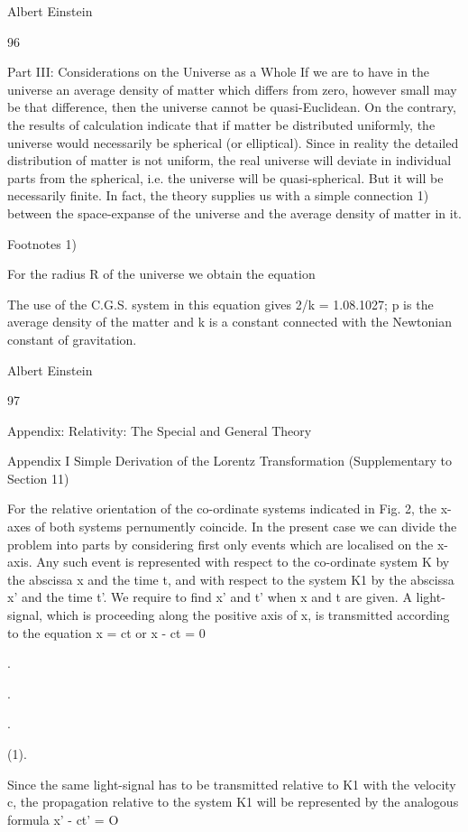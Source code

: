 \documentclass{article}
\begin{document}
Albert Einstein

96

Part III: Considerations on the Universe as a Whole
If we are to have in the universe an average density of matter which differs from zero,
however small may be that difference, then the universe cannot be quasi-Euclidean. On the
contrary, the results of calculation indicate that if matter be distributed uniformly, the
universe would necessarily be spherical (or elliptical). Since in reality the detailed
distribution of matter is not uniform, the real universe will deviate in individual parts from
the spherical, i.e. the universe will be quasi-spherical. But it will be necessarily finite. In
fact, the theory supplies us with a simple connection 1) between the space-expanse of the
universe and the average density of matter in it.

Footnotes
1)

For the radius R of the universe we obtain the equation

The use of the C.G.S. system in this equation gives 2/k = 1.08.1027; p is the average density
of the matter and k is a constant connected with the Newtonian constant of gravitation.

Albert Einstein

97

Appendix: Relativity: The Special and General Theory

Appendix I
Simple Derivation of the Lorentz Transformation
(Supplementary to Section 11)

For the relative orientation of the co-ordinate systems indicated in Fig. 2, the x-axes of
both systems pernumently coincide. In the present case we can divide the problem into parts
by considering first only events which are localised on the x-axis. Any such event is
represented with respect to the co-ordinate system K by the abscissa x and the time t, and
with respect to the system K1 by the abscissa x' and the time t'. We require to find x' and t'
when x and t are given.
A light-signal, which is proceeding along the positive axis of x, is transmitted according
to the equation
x = ct
or
x - ct = 0

.

.

.

(1).

Since the same light-signal has to be transmitted relative to K1 with the velocity c, the
propagation relative to the system K1 will be represented by the analogous formula
x' - ct' = O
\end{document}
